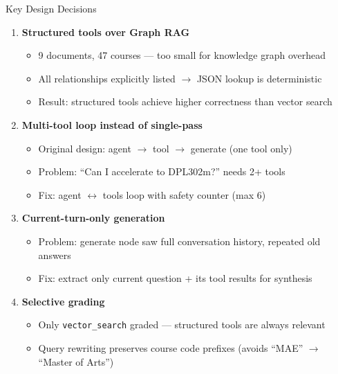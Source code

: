 \documentclass[aspectratio=169,10pt]{beamer}
\begin{document}
\begin{frame}{Key Design Decisions}

\begin{enumerate}
    \item \textbf{Structured tools over Graph RAG}
    \begin{itemize}
        \footnotesize
        \item 9 documents, 47 courses --- too small for knowledge graph overhead
        \item All relationships explicitly listed $\rightarrow$ JSON lookup is deterministic
        \item Result: structured tools achieve higher correctness than vector search
    \end{itemize}

    \vspace{0.3em}
    \item \textbf{Multi-tool loop instead of single-pass}
    \begin{itemize}
        \footnotesize
        \item Original design: agent $\rightarrow$ tool $\rightarrow$ generate (one tool only)
        \item Problem: ``Can I accelerate to DPL302m?'' needs 2+ tools
        \item Fix: agent $\leftrightarrow$ tools loop with safety counter (max 6)
    \end{itemize}

    \vspace{0.3em}
    \item \textbf{Current-turn-only generation}
    \begin{itemize}
        \footnotesize
        \item Problem: generate node saw full conversation history, repeated old answers
        \item Fix: extract only current question + its tool results for synthesis
    \end{itemize}

    \vspace{0.3em}
    \item \textbf{Selective grading}
    \begin{itemize}
        \footnotesize
        \item Only \texttt{vector\_search} graded --- structured tools are always relevant
        \item Query rewriting preserves course code prefixes (avoids ``MAE'' $\rightarrow$ ``Master of Arts'')
    \end{itemize}
\end{enumerate}

\end{frame}
\end{document}
